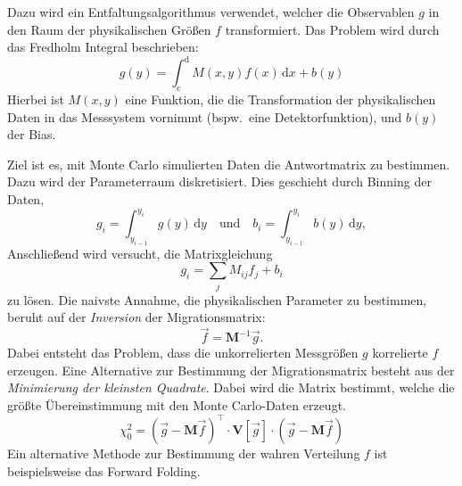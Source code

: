 
Dazu wird ein
Entfaltungsalgorithmus verwendet,
welcher die Observablen $g$
in den Raum der physikalischen Größen $f$ transformiert.
Das Problem wird durch das Fredholm Integral beschrieben:
\begin{equation}
	g(y) = \int_\text{c}^\text{d} M(x,y) f(x) \, \text{d}x + b(y)
\end{equation}
Hierbei ist $M(x, y)$ eine Funktion, die die Transformation der physikalischen
Daten in das Messsystem vornimmt (bspw.\ eine Detektorfunktion), und $b(y)$ der Bias.

Ziel ist es, mit Monte Carlo simulierten Daten
die Antwortmatrix zu bestimmen.
Dazu wird der Parameterraum diskretisiert.
Dies geschieht durch Binning der Daten,
\begin{equation}
	g_i = \int_{y_{i-1}}^{y_i} g(y) \, \text{d}y \quad \text{und} \quad
	b_i = \int_{y_{i-1}}^{y_i} b(y) \, \text{d}y,
\end{equation}
Anschließend wird versucht, die Matrixgleichung
\begin{equation}
	g_i = \sum_j M_{ij} f_j + b_i
\end{equation}
zu lösen.
Die naivste Annahme, die physikalischen Parameter zu bestimmen,
beruht auf der \textit{Inversion} der Migrationsmatrix:
\begin{equation}
    \vec{f} = \mathbf{M}^{-1} \vec{g}.
\end{equation}
Dabei entsteht das Problem, dass die unkorrelierten Messgrößen $g$
korrelierte $f$ erzeugen.
Eine Alternative zur Bestimmung der Migrationsmatrix
besteht aus der \textit{Minimierung der kleinsten Quadrate}.
Dabei wird die Matrix bestimmt,
welche die größte Übereinstimmung mit den Monte Carlo-Daten erzeugt.
\begin{equation}
    \chi^2_0 = {\left( \vec{g} - \mathbf{M} \vec{f} \right)}^\intercal
        \cdot \mathbf{V} \left[ \vec{g} \right] \cdot
        \left( \vec{g} - \mathbf{M} \vec{f} \right)
\end{equation}
Ein alternative Methode zur Bestimmung der wahren Verteilung $f$ ist beispielsweise das Forward Folding.

